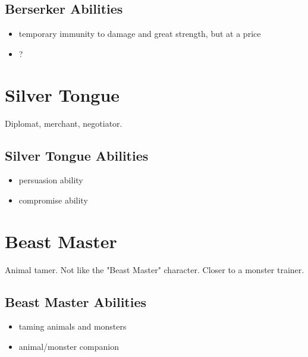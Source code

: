 \begin{multicols}{2}
\subsection{Berserker Abilities}

\begin{itemize}
    \item temporary immunity to damage and great strength, but at a price
    \item ?
\end{itemize}

\section{Silver Tongue}

Diplomat, merchant, negotiator.

\subsection{Silver Tongue Abilities}

\begin{itemize}
    \item persuasion ability
    \item compromise ability
\end{itemize}

\section{Beast Master}

Animal tamer. Not like the "Beast Master" character. Closer to a monster trainer.

\subsection{Beast Master Abilities}

\begin{itemize}
    \item taming animals and monsters
    \item animal/monster companion
\end{itemize}

\end{multicols}
